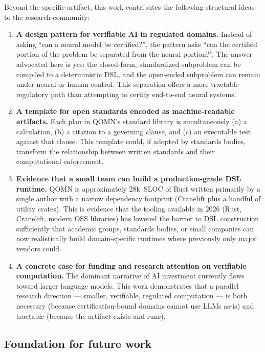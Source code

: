 \documentclass[11pt,a4paper]{article}
\begin{document}
\begin{enumerate}[leftmargin=*]
Beyond the specific artifact, this work contributes the following structural ideas to the research community:

\begin{enumerate}[leftmargin=*]
\item \textbf{A design pattern for verifiable AI in regulated domains.} Instead of asking ``can a neural model be certified?'', the pattern asks ``can the certified portion of the problem be separated from the neural portion?''. The answer advocated here is yes: the closed-form, standardized subproblem can be compiled to a deterministic DSL, and the open-ended subproblem can remain under neural or human control. This separation offers a more tractable regulatory path than attempting to certify end-to-end neural systems.
\item \textbf{A template for open standards encoded as machine-readable artifacts.} Each plan in QOMN's standard library is simultaneously (a) a calculation, (b) a citation to a governing clause, and (c) an executable test against that clause. This template could, if adopted by standards bodies, transform the relationship between written standards and their computational enforcement.
\item \textbf{Evidence that a small team can build a production-grade DSL runtime.} QOMN is approximately 28k~SLOC of Rust written primarily by a single author with a narrow dependency footprint (Cranelift plus a handful of utility crates). This is evidence that the tooling available in 2026 (Rust, Cranelift, modern OSS libraries) has lowered the barrier to DSL construction sufficiently that academic groups, standards bodies, or small companies can now realistically build domain-specific runtimes where previously only major vendors could.
\item \textbf{A concrete case for funding and research attention on verifiable computation.} The dominant narrative of AI investment currently flows toward larger language models. This work demonstrates that a parallel research direction --- smaller, verifiable, regulated computation --- is both necessary (because certification-bound domains cannot use LLMs as-is) and tractable (because the artifact exists and runs).
\end{enumerate}

\subsection{Foundation for future work}


\end{enumerate}
\end{document}
